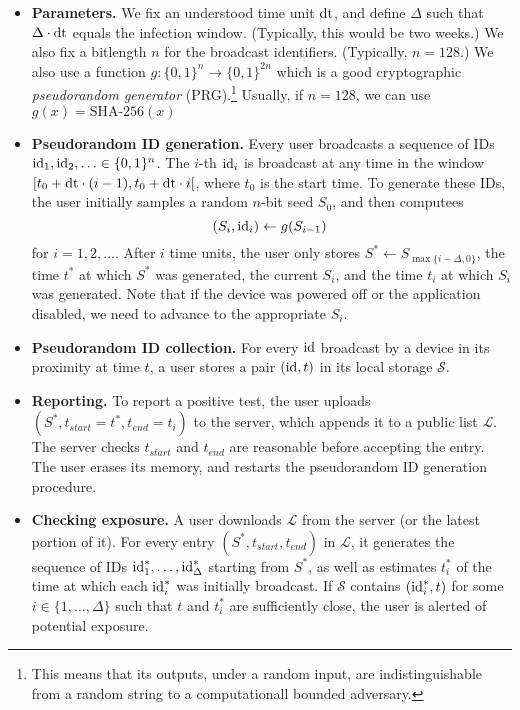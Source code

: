 \documentclass{article}
\newcommand{\TODO}[1]{ {\color{blue} #1 }}
\begin{document}
\begin{itemize}
    \item {\bf Parameters.} We fix an understood time unit $\mathrm{dt}$, and define $\Delta$ such that $\Delta \cdot \mathrm{dt}$ equals the infection window. (Typically, this would be two weeks.) We also fix a bitlength $n$ for the broadcast identifiers. (Typically, $n = 128$.) We also use a function $g: \{0,1\}^n \to \{0,1\}^{2n}$ which is a good cryptographic {\em pseudorandom generator} (PRG).\footnote{This means that its outputs, under a random input, are indistinguishable from a random string to a computationall bounded adversary.} Usually, if $n = 128$, we can use $g(x) = \textrm{SHA-256}(x)$
    \item {\bf Pseudorandom ID generation.} Every user broadcasts a sequence of IDs $\mathrm{id}_1, \mathrm{id}_2, \ldots \in \{0,1\}^n$.  The $i$-th $\mathrm{id}_i$ is broadcast at any time in the window $[t_0 + \mathrm{dt}\cdot (i-1), t_0 + \mathrm{dt}\cdot i[$, where $t_0$ is the start time. To generate these IDs, the user initially samples a random $n$-bit seed $S_0$, and then computees
\begin{displaymath}
(S_i, \mathrm{id}_i) \gets g(S_{i-1}) \;
\end{displaymath}
for $i = 1,2, \ldots$.
After $i$ time units, the user only stores $S^* \gets S_{\max\{i-\Delta,0\}}$, the time $t^*$ at which $S^*$ was generated, the current $S_i$, and the time $t_i$ at which $S_i$ was generated. Note that if the device was powered off or the application disabled, we need to advance to the appropriate $S_i$. 

\item {\bf Pseudorandom ID collection.} For every $\mathrm{id}$ broadcast by a device in its proximity at time $t$, a user stores a pair $(\mathrm{id}, t)$ in its local storage $\mathcal{S}$.
\item {\bf Reporting.} To report a positive test, the user uploads $(S^*, t_{start}=t^*, t_{end}=t_i)$ to the server, which appends it to a public list $\mathcal{L}$. The server checks $t_{start}$ and $t_{end}$ are reasonable before accepting the entry. The user erases its memory, and restarts the pseudorandom ID generation procedure.
\item {\bf Checking exposure.} A user downloads $\mathcal{L}$ from the server (or the latest portion of it). For every entry $(S^*,t_{start}, t_{end})$ in $\mathcal{L}$, it generates the sequence of IDs $\mathrm{id}^*_1, \ldots, \mathrm{id}^*_{\Delta}$ starting from $S^*$, as well as  estimates $t_i^*$ of the time at which each $\mathrm{id}_i^*$ was initially broadcast. If $\mathcal{S}$ contains $(\mathrm{id}_i^*, t)$ for some $i \in \{1, \ldots, \Delta\}$ such that $t$ and $t_i^*$ are sufficiently close, the user is alerted of potential exposure.
\end{itemize}
\end{document}
